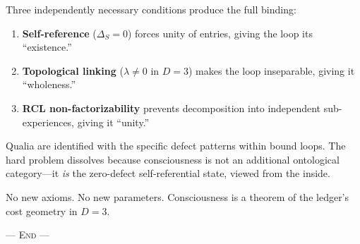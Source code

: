 \documentclass[11pt,a4paper]{article}
\theoremstyle{plain}
\theoremstyle{definition}
\theoremstyle{remark}
\begin{document}
Three independently necessary conditions produce the full binding:
\begin{enumerate}[nosep]
\item \textbf{Self-reference} ($\Delta_S = 0$) forces unity of
  entries, giving the loop its ``existence.''
\item \textbf{Topological linking} ($\lambda \neq 0$ in $D = 3$)
  makes the loop inseparable, giving it ``wholeness.''
\item \textbf{RCL non-factorizability} prevents decomposition into
  independent sub-experiences, giving it ``unity.''
\end{enumerate}

Qualia are identified with the specific defect patterns within bound
loops.  The hard problem dissolves because consciousness is not an
additional ontological category---it \emph{is} the zero-defect
self-referential state, viewed from the inside.

No new axioms.  No new parameters.  Consciousness is a theorem of the
ledger's cost geometry in $D = 3$.

\bigskip
\begin{center}
\textsc{--- End ---}
\end{center}
\end{document}
